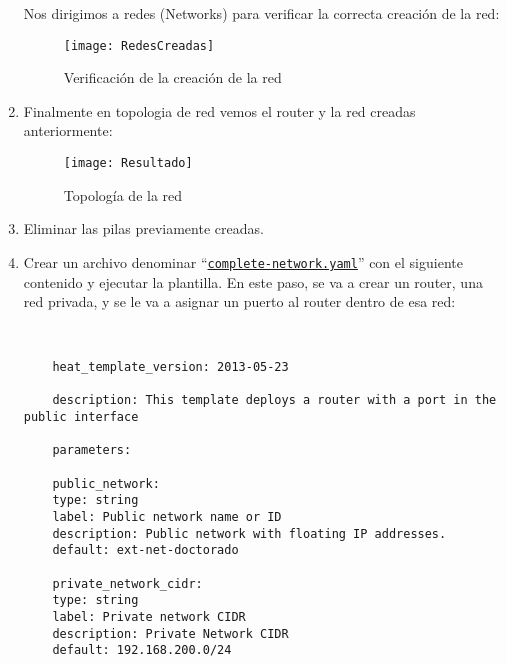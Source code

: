 \documentclass[10pt]{article}   			%
\begin{document}
\begin{enumerate}
Nos dirigimos a redes (Networks) para  verificar la correcta creación de la red: 

\begin{figure}[ht] %
	\centering
	\texttt{[image: RedesCreadas]}   %
	\caption{Verificación de la creación de la red} \label{fig:Elementos}
\end{figure}

\item Finalmente en topologia de red vemos el router y la red creadas anteriormente: \\




\begin{figure}[H] %
	\centering
	\texttt{[image: Resultado]}   %
	\caption{Topología de la red} \label{fig:Elementos}
\end{figure}

\item Eliminar las pilas previamente creadas. 



\item 	Crear un archivo denominar “\texttt{\href{https://github.com/wilrilo/talleres/blob/master/file/taller1/complete-network.yaml}{complete-network.yaml}}” con el siguiente contenido y ejecutar la plantilla. En este paso, se va a crear un router, una red privada, y se le va a asignar un puerto al router dentro de esa red:


\begin{small}
	\begin{lstlisting}[frame=single,style=base]	
	
	
	heat_template_version: 2013-05-23
	
	description: This template deploys a router with a port in the public interface
	
	parameters:
	
	public_network:
	type: string
	label: Public network name or ID
	description: Public network with floating IP addresses.
	default: ext-net-doctorado
	
	private_network_cidr:
	type: string
	label: Private network CIDR
	description: Private Network CIDR
	default: 192.168.200.0/24
	

\end{lstlisting}
\end{small}
\end{enumerate}
\end{document}
